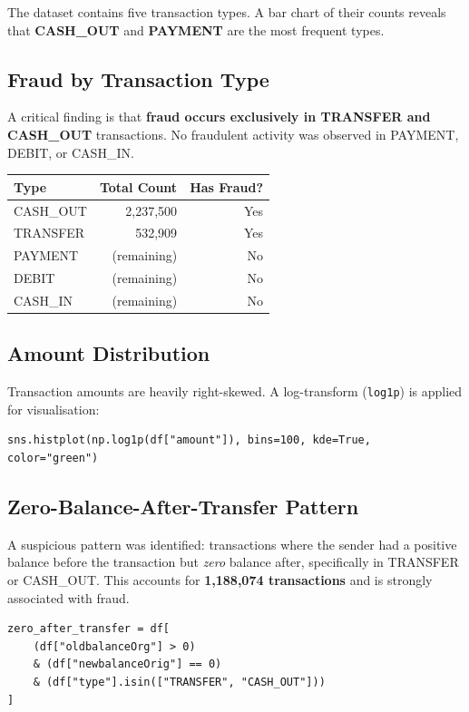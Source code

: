 \documentclass[12pt, a4paper]{article}
\begin{document}
The dataset contains five transaction types. A bar chart of their counts reveals that \textbf{CASH\_OUT} and \textbf{PAYMENT} are the most frequent types.

\subsection{Fraud by Transaction Type}

A critical finding is that \textbf{fraud occurs exclusively in TRANSFER and CASH\_OUT} transactions. No fraudulent activity was observed in PAYMENT, DEBIT, or CASH\_IN.

\begin{center}
\begin{tabular}{lrr}
\toprule
\textbf{Type} & \textbf{Total Count} & \textbf{Has Fraud?} \\
\midrule
CASH\_OUT  & 2,237,500 & Yes \\
TRANSFER   &   532,909 & Yes \\
PAYMENT    & (remaining) & No \\
DEBIT      & (remaining) & No \\
CASH\_IN   & (remaining) & No \\
\bottomrule
\end{tabular}
\end{center}

\subsection{Amount Distribution}

Transaction amounts are heavily right-skewed. A log-transform (\texttt{log1p}) is applied for visualisation:

\begin{lstlisting}
sns.histplot(np.log1p(df["amount"]), bins=100, kde=True, color="green")
\end{lstlisting}

\subsection{Zero-Balance-After-Transfer Pattern}

A suspicious pattern was identified: transactions where the sender had a positive balance before the transaction but \textit{zero} balance after, specifically in TRANSFER or CASH\_OUT. This accounts for \textbf{1,188,074 transactions} and is strongly associated with fraud.

\begin{lstlisting}
zero_after_transfer = df[
    (df["oldbalanceOrg"] > 0)
    & (df["newbalanceOrig"] == 0)
    & (df["type"].isin(["TRANSFER", "CASH_OUT"]))
]
\end{lstlisting}
\end{document}
